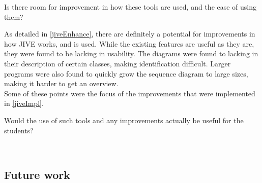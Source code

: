 \begin{theorem}
Is there room for improvement in how these tools are used, and the ease of using them?
\end{theorem}

As detailed in \autoref{jiveEnhance}, there are definitely a potential for improvements in how JIVE works, and is used.
While the existing features are useful as they are, they were found to be lacking in usability.
The diagrams were found to lacking in their description of certain classes, making identification difficult.
Larger programs were also found to quickly grow the sequence diagram to large sizes, making it harder to get an overview.
~\\

Some of these points were the focus of the improvements that were implemented in \autoref{jiveImpl}.
~\\

\begin{theorem}
Would the use of such tools and any improvements actually be useful for the students?
\end{theorem}
~\\

\subsection{Future work}\label{conclusionFuture}
